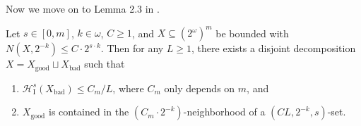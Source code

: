 Now we move on to Lemma 2.3 in \cite{Orp21}. 

\begin{proposition}
    \label{proposition:effective_good_bad_decomp_Cantor}
    Let $s \in [0, m]$, $k \in \omega$, $C \geq 1$, and $X \subseteq (2^\omega)^m$ be bounded with $N(X, 2^{-k}) \leq C \cdot 2^{s \cdot k}$.
    Then for any $L \geq 1$, there exists a disjoint decomposition $X = X_{\operatorname{good}} \sqcup X_{\operatorname{bad}}$ such that
    \begin{enumerate}[label=(\roman*)]
        \item $\mathcal{H}^s_{\operatorname{I}}(X_{\operatorname{bad}}) \leq C_m/L$, where $C_m$ only depends on $m$, and
        \item $X_{\operatorname{good}}$ is contained in the $(C_m \cdot 2^{-k})$-neighborhood of a $(CL, 2^{-k}, s)$-set. 
    \end{enumerate}
\end{proposition}
